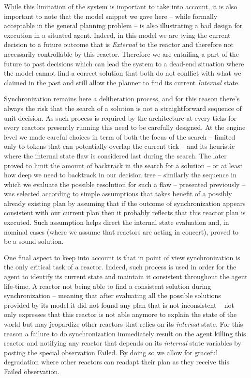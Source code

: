While this limitation of the system is important to take into account,
it is also important to note that the model snippet we gave here --
while formally acceptable in the general planning problem -- is also
illustrating a bad design for execution in a situated agent. Indeed,
in this model we are tying the current decision to a future outcome
that is {\em External} to the reactor and therefore not necessarily
controllable by this reactor. Therefore we are entailing a part of the
future to past decisions which can lead the system to a dead-end
situation where the model cannot find a correct solution that both do
not conflict with what we claimed in the past and still allow the
planner to find its current {\em Internal} state.

Synchronization remains here a deliberation process, and for this
reason there's always the risk that the search of a solution is not a
straightforward sequence of unit decision. As such process is required
by the architecture at every ticks for every reactors presently
running this need to be carefully designed. At the engine level we
made careful choices in term of both the focus of the search --
limited only to tokens that can potentially overlap the current tick
-- and its heuristic where the internal state flaw is considered last
during the search. The later proved to limit the amount of backtrack
in the search for a solution -- or at least how deep we need to
backtrack in our decision tree -- similarly the sequence in which we
evaluate the possible resolution for such a flaw -- presented
previously -- was selected according to simple assumptions that takes
benefit of a possibly already existing plan by assuming that if the
outcome of synchronization appears consistent with our current plan
then it probably reflects that this reactor plan is executed. Such
assumption helps direct the internal state evaluation and, in nominal
cases (where we assume that reactors are acting in concert), proved to
be a sound solution.

One final aspect to keep into account is that in \rx point of view
synchronization is the only critical task of a reactor. Indeed, such
process is used in order for the agent to identify its current state
and maintain it consistent throughout the agent life-time. A reactor
not being able to find a consistent solution during synchronization --
meaning that after evaluating all the possible solutions provided by
its model it did not found any plan that is not inconsistent -- not
only expresses that this reactor is not able anymore to explain the
state of the world but may jeopardize other reactors that relies on
its {\em internal} state. For this reason a failure to do
synchronization immediately result on the agent killing this reactor
and notifying any reactor that depends on its {\em internal} state
variables by posting the special observation \textsf{Failed}. By doing
so we allow for graceful degradation where other reactors can readapt
their plan as they receive this \textsf{Failed} observation.

